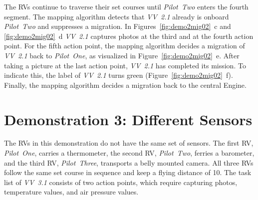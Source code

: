 The \acp{RV} continue to traverse their set courses until \textit{Pilot~Two} enters the fourth segment.
The mapping algorithm detects that \textit{VV~2.1} already is onboard \textit{Pilot~Two} and suppresses
a migration. In Figures~\ref{fig:demo2mig02}~c and \ref{fig:demo2mig02}~d \textit{VV~2.1} captures
photos at the third and at the fourth action point.
%
For the fifth action point, the mapping algorithm decides a migration of \textit{VV~2.1} back to
\textit{Pilot~One}, as visualized in Figure~\ref{fig:demo2mig02}~e. After taking a picture at the last
action point, \textit{VV~2.1} has completed its mission. To indicate this, the label of \textit{VV~2.1}
turns green (Figure~\ref{fig:demo2mig02}~f).
Finally, the mapping algorithm decides a migration back to the central Engine.


\section{Demonstration 3: Different Sensors}
The \acp{RV} in this demonstration do not have the same set of sensors. The first \ac{RV}, \textit{Pilot~One},
carries a thermometer, the second \ac{RV}, \textit{Pilot~Two}, ferries a barometer, and the third \ac{RV},
\textit{Pilot~Three}, transports a belly mounted camera.
All three \acp{RV} follow the same set course in sequence and keep a flying distance of \unit{10}{\second}.
The task list of \textit{VV~3.1} consists of two action points, which require capturing photos, temperature
values, and air pressure values.   

